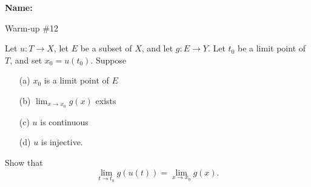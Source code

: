 \documentclass[12pt]{article}
\begin{document}
\noindent \textbf{Name:} 

\begin{center}
Warm-up \#12
\end{center}

\noindent Let $u : T \to X$, let $E$ be a subset of $X$, and let $g : E \to Y$. Let $t_0$ be a limit point of $T$, and set $x_0 = u(t_0)$. Suppose 
\begin{enumerate}
\item[(a)] $x_0$ is a limit point of $E$
\item[(b)] $\lim_{x \to x_0}g(x)$ exists
\item[(c)] $u$ is continuous 
\item[(d)] $u$ is injective.
\end{enumerate}
Show that 
\[
\lim_{t \to t_0}g(u(t)) = \lim_{x \to x_0}g(x). 
\]
\end{document}

